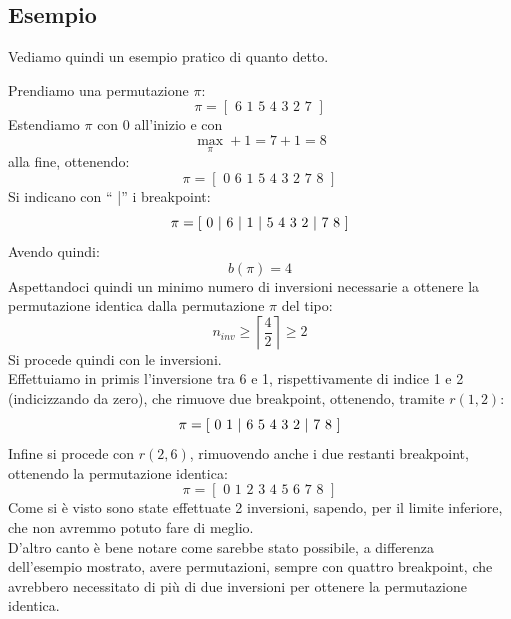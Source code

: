 \documentclass[a4paper,12pt, oneside]{book}
\begin{document}
\subsection{Esempio}
Vediamo quindi un esempio pratico di quanto detto.
\begin{esempio}
  Prendiamo una permutazione $\pi$:
  \[\pi=[\mbox{ 6 1 5 4 3 2 7 }]\]
  Estendiamo $\pi$ con $0$ all'inizio e con
  \[\max_{\pi}+1=7+1=8\]
  alla fine, ottenendo:
  \[\pi=[\mbox{ 0 6 1 5 4 3 2 7 8 }]\]
  Si indicano con `` \textnormal{|}'' i breakpoint:
  \[\pi=[\mbox{ 0 \textnormal{|} 6 \textnormal{|} 1 \textnormal{|}  5 4 3 2
      \textnormal{|} 7 8 }]\] 
  Avendo quindi:
  \[b(\pi)=4\]
  Aspettandoci quindi un minimo numero di inversioni necessarie a
  ottenere la permutazione identica dalla permutazione $\pi$ del tipo:
  \[n_{inv}\geq\left\lceil\frac{4}{2}\right\rceil\geq 2\]
  Si procede quindi con le inversioni.\\
  Effettuiamo in primis l'inversione tra 6 e 1, rispettivamente di indice 1 e 2
  (indicizzando da zero), che rimuove due breakpoint,
  ottenendo, tramite $r(1,2)$:
  \[\pi=[\mbox{ 0 1 \textnormal{|} 6 5 4 3 2
      \textnormal{|} 7 8 }]\]
  Infine si procede con $r(2,6)$, rimuovendo anche i due restanti breakpoint,
  ottenendo la permutazione identica: 
  \[\pi=[\mbox{ 0 1 2 3 4 5 6 7 8 }]\]
  Come si è visto sono state effettuate 2 inversioni, sapendo, per il limite
  inferiore, che non avremmo potuto fare di meglio.\\
  D'altro canto è bene notare
  come sarebbe stato possibile, a differenza dell'esempio mostrato,  avere
  permutazioni, sempre con quattro 
  breakpoint, che avrebbero necessitato di più di due inversioni per ottenere la
  permutazione identica. 
\end{esempio}
\end{document}
